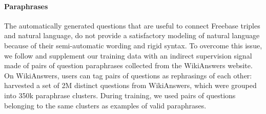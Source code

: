 \documentclass[runningheads,a4paper]{llncs}
\newcommand{\fb}{{\sc Freebase}\xspace}
\newcommand{\wk}{{\sc WikiAnswers}\xspace}
\begin{document}
\paragraph{Paraphrases}

The automatically generated questions that are useful to connect \fb
triples and natural language, do not provide a satisfactory
modeling of natural language because of their semi-automatic wording
and rigid syntax.
To overcome this issue, we follow \cite{paralex} and supplement our training data with an
indirect supervision signal made of pairs of question paraphrases
collected from the \wk website.
On \wk, users can tag pairs of questions as rephrasings of each other:
\cite{paralex} harvested a set of 2M distinct questions from
\wk, which were grouped into 350k paraphrase clusters.
During training, we used pairs of questions belonging to the same
clusters as examples of valid paraphrases.
\fi
\end{document}
